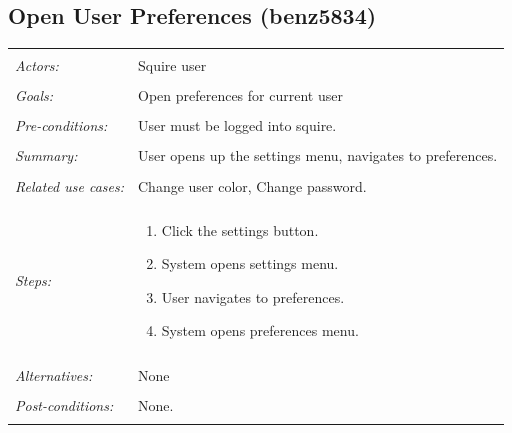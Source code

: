 \documentclass[11pt]{report}
\begin{document}
\subsection{Open User Preferences (benz5834)}
\begin{tabular}{ p{2cm} p{12cm} }
 \hline
 \\
 \textit{Actors:} & Squire user \\ 
 \\
 \textit{Goals:} & Open preferences for current user \\
 \\
 \textit{Pre-conditions:} & User must be logged into squire. \\
 \\
 \textit{Summary:} & User opens up the settings menu, navigates to preferences.  \\ 
 \\
 \textit{Related use cases:} & Change user color, Change password. \\ 
 \\
 \textit{Steps:} & \begin{enumerate}
  \item Click the settings button.
  \item System opens settings menu.
  \item User navigates to preferences. 
  \item System opens preferences menu.
 \end{enumerate} \\
 \\
 \textit{Alternatives:} & None \\
 \\
 \textit{Post-conditions:} & None. \\
 \\
\hline
\end{tabular}
\end{document}
